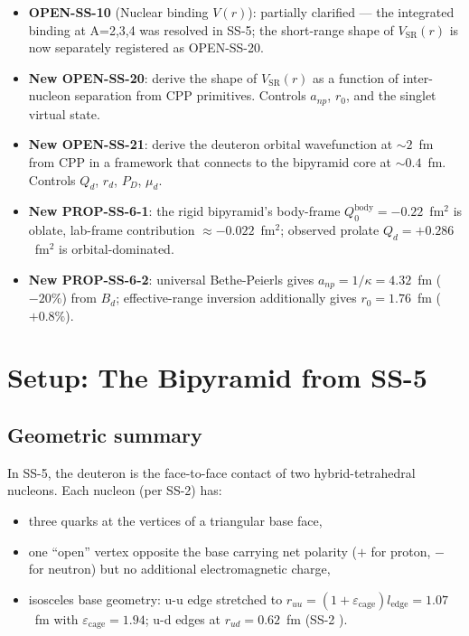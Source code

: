 \documentclass[11pt,letterpaper]{article}
\newcommand{\Bd}{B_{d}}
\newcommand{\Qd}{Q_{d}}
\newcommand{\PD}{P_{D}}
\newcommand{\mud}{\mu_{d}}
\newcommand{\anp}{a_{np}}
\newcommand{\rzero}{r_{0}}
\newcommand{\ledge}{l_{\mathrm{edge}}}
\newcommand{\VSR}{V_{\mathrm{SR}}}
\begin{document}
\begin{itemize}
\item \textbf{OPEN-SS-10} (Nuclear binding $V(r)$): partially clarified --- the integrated binding at A=2,3,4 was resolved in SS-5; the short-range shape of $\VSR(r)$ is now separately registered as OPEN-SS-20.
\item \textbf{New OPEN-SS-20}: derive the shape of $\VSR(r)$ as a function of inter-nucleon separation from CPP primitives. Controls $\anp$, $\rzero$, and the singlet virtual state.
\item \textbf{New OPEN-SS-21}: derive the deuteron orbital wavefunction at ${\sim}2$~fm from CPP in a framework that connects to the bipyramid core at ${\sim}0.4$~fm. Controls $\Qd$, $r_d$, $\PD$, $\mud$.
\item \textbf{New PROP-SS-6-1}: the rigid bipyramid's body-frame $Q_0^{\mathrm{body}} = -0.22$~fm$^2$ is oblate, lab-frame contribution $\approx -0.022$~fm$^2$; observed prolate $\Qd = +0.286$~fm$^2$ is orbital-dominated.
\item \textbf{New PROP-SS-6-2}: universal Bethe-Peierls gives $\anp = 1/\kappa = 4.32$~fm ($-20\%$) from $\Bd$; effective-range inversion additionally gives $\rzero = 1.76$~fm ($+0.8\%$).
\end{itemize}

\section{Setup: The Bipyramid from SS-5}
\label{sec:setup}

\subsection{Geometric summary}

In SS-5, the deuteron is the face-to-face contact of two hybrid-tetrahedral nucleons. Each nucleon (per SS-2) has:
\begin{itemize}
\item three quarks at the vertices of a triangular base face,
\item one ``open'' vertex opposite the base carrying net polarity ($+$ for proton, $-$ for neutron) but no additional electromagnetic charge,
\item isosceles base geometry: u-u edge stretched to $r_{uu} = (1 + \varepsilon_{\mathrm{cage}}) \ledge = 1.07$~fm with $\varepsilon_{\mathrm{cage}} = 1.94$; u-d edges at $r_{ud} = 0.62$~fm (SS-2 \cite{abshier2026ss2}).
\end{itemize}
\end{document}

